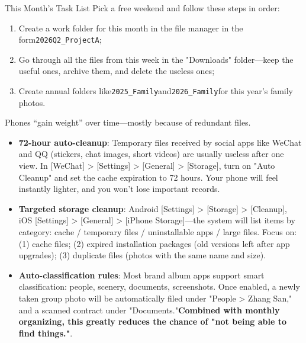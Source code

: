 \begin{tcbpractice}{This Month's Task List}
Pick a free weekend and follow these steps in order:

\begin{enumerate}
  \item Create a work folder for this month in the file manager in the form\texttt{2026Q2\_ProjectA};
  \item Go through all the files from this week in the "Downloads" folder—keep the useful ones, archive them, and delete the useless ones;
  \item Create annual folders like\texttt{2025\_Family}and\texttt{2026\_Family}for this year's family photos.
\end{enumerate}

\end{tcbpractice}


Phones “gain weight” over time—mostly because of redundant files.

\begin{itemize}
  \item \textbf{72-hour auto-cleanup}: Temporary files received by social apps like WeChat and QQ (stickers, chat images, short videos) are usually useless after one view. In [WeChat] > [Settings] > [General] > [Storage], turn on "Auto Cleanup" and set the cache expiration to 72 hours. Your phone will feel instantly lighter, and you won't lose important records.
  \item \textbf{Targeted storage cleanup}: Android [Settings] > [Storage] > [Cleanup], iOS [Settings] > [General] > [iPhone Storage]—the system will list items by category: cache / temporary files / uninstallable apps / large files. Focus on: (1) cache files; (2) expired installation packages (old versions left after app upgrades); (3) duplicate files (photos with the same name and size).
  \item \textbf{Auto-classification rules}: Most brand album apps support smart classification: people, scenery, documents, screenshots. Once enabled, a newly taken group photo will be automatically filed under "People > Zhang San," and a scanned contract under "Documents."\textbf{Combined with monthly organizing, this greatly reduces the chance of "not being able to find things."}.
\end{itemize}


